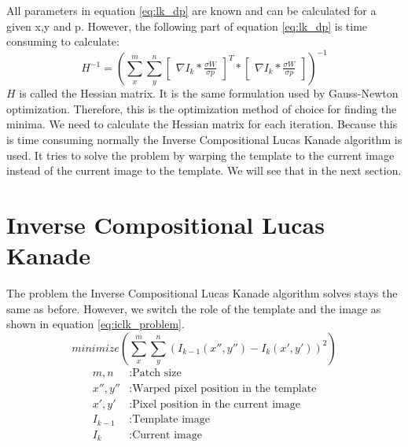 \documentclass[11pt,a4paper,titlepage,oneside]{report}
\begin{document}
All parameters in equation \ref{eq:lk_dp} are known and can be calculated for a given x,y and p. However, the following part of equation \ref{eq:lk_dp} is time consuming to calculate:
\begin{equation}
	H^{-1}=(\sum_x^m\sum_y^n\begin{bmatrix}\nabla I_{k}*\frac{\sigma W}{\sigma p}\end{bmatrix}^T*\begin{bmatrix}\nabla I_{k}*\frac{\sigma W}{\sigma p}\end{bmatrix})^{-1}
\end{equation}
$H$ is called the Hessian matrix. It is the same formulation used by Gauss-Newton optimization. Therefore, this is the optimization method of choice for finding the minima. We need to calculate the Hessian matrix for each iteration. Because this is time consuming normally the Inverse Compositional Lucas Kanade algorithm is used. It tries to solve the problem by warping the template to the current image instead of the current image to the template. We will see that in the next section.

\section{Inverse Compositional Lucas Kanade}
The problem the Inverse Compositional Lucas Kanade algorithm solves stays the same as before. However, we switch the role of the template and the image as shown in equation \ref{eq:iclk_problem}.
\begin{equation}\label{eq:iclk_problem}
	minimize(\sum_x^m\sum_y^n(I_{k-1}(x'',y'')-I_{k}(x',y'))^2)
\end{equation}
\begin{align*}
	m,n				 &: \text{Patch size}\\
  x'',y''    &: \text{Warped pixel position in the template}\\
  x',y'      &: \text{Pixel position in the current image}\\
  I_{k-1}    &: \text{Template image}\\
  I_{k}      &: \text{Current image}
\end{align*}
\end{document}

